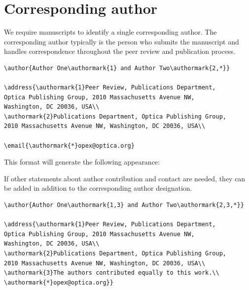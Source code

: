 \documentclass{optica-article}
\begin{document}
\section{Corresponding author}

We require manuscripts to identify a single corresponding author. The
corresponding author typically is the person who submits the manuscript and
handles correspondence throughout the peer review and publication process.

\begin{verbatim}
\author{Author One\authormark{1} and Author Two\authormark{2,*}}

\address{\authormark{1}Peer Review, Publications Department,
Optica Publishing Group, 2010 Massachusetts Avenue NW,
Washington, DC 20036, USA\\
\authormark{2}Publications Department, Optica Publishing Group,
2010 Massachusetts Avenue NW, Washington, DC 20036, USA\\

\email{\authormark{*}opex@optica.org}
\end{verbatim}

This format will generate the following appearance:

\bigskip

\author{Author One and Author Two}

\address{Peer Review, Publications Department,
	Optica Publishing Group, 2010 Massachusetts Avenue NW,
	Washington, DC 20036, USA\\
	Publications Department, Optica Publishing Group,
	2010 Massachusetts Avenue NW, Washington, DC 20036, USA\\

	}

\medskip

If other statements about author contribution and contact are needed, they can
be added in addition to the corresponding author designation.
\begin{verbatim}
\author{Author One\authormark{1,3} and Author Two\authormark{2,3,*}}

\address{\authormark{1}Peer Review, Publications Department,
Optica Publishing Group, 2010 Massachusetts Avenue NW,
Washington, DC 20036, USA\\
\authormark{2}Publications Department, Optica Publishing Group,
2010 Massachusetts Avenue NW, Washington, DC 20036, USA\\
\authormark{3}The authors contributed equally to this work.\\
\authormark{*}opex@optica.org}}
\end{verbatim}
\end{document}
